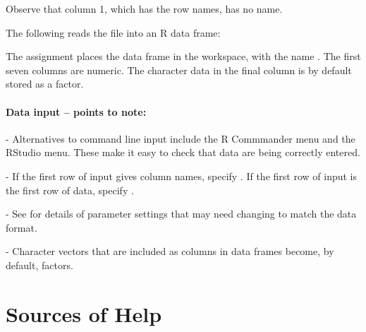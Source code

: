 \noindent Observe that column 1, which has the row names, has no name.

The following reads the file into an R data frame:
\begin{knitrout}
\color{fgcolor}\begin{kframe}
\begin{alltt}
 \hlkwb{<-} \hlstd{(}\hlstd{,}
                          \hlstd{=}\hlstd{,} \hlstd{=}\hlstd{)}
\end{alltt}
\end{kframe}
\end{knitrout}
The assignment places the data frame in the workspace, with the name
.  The first seven columns are numeric.  The
character data in the final column is by default stored as a factor.

\paragraph{Data input -- points to note:}

\begin{itemizz}
\item [-] Alternatives to command line input include the
  R Commmander menu and the RStudio menu.  These make it
  easy to check that data are being correctly entered.
\item[-] If the first row of input gives column names, specify
  .  If the first row of input is the first row of
  data, specify .
\item[-] See  for details of parameter
  settings that may need changing to match the data format.
\item[-] Character vectors that are included as columns in data frames
  become, by default, factors.  
\end{itemizz}

\section{Sources of Help}\label{sec:workinghelp}

